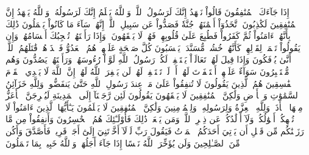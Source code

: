 إِذَا جَآءَكَ ٱلۡمُنَٰفِقُونَ قَالُواْ نَشۡهَدُ إِنَّكَ لَرَسُولُ ٱللَّهِۗ وَٱللَّهُ يَعۡلَمُ إِنَّكَ لَرَسُولُهُۥ وَٱللَّهُ يَشۡهَدُ إِنَّ ٱلۡمُنَٰفِقِينَ لَكَٰذِبُونَ
ٱتَّخَذُوٓاْ أَيۡمَٰنَهُمۡ جُنَّةٗ فَصَدُّواْ عَن سَبِيلِ ٱللَّهِۚ إِنَّهُمۡ سَآءَ مَا كَانُواْ يَعۡمَلُونَ
ذَٰلِكَ بِأَنَّهُمۡ ءَامَنُواْ ثُمَّ كَفَرُواْ فَطُبِعَ عَلَىٰ قُلُوبِهِمۡ فَهُمۡ لَا يَفۡقَهُونَ
۞وَإِذَا رَأَيۡتَهُمۡ تُعۡجِبُكَ أَجۡسَامُهُمۡۖ وَإِن يَقُولُواْ تَسۡمَعۡ لِقَوۡلِهِمۡۖ كَأَنَّهُمۡ خُشُبٞ مُّسَنَّدَةٞۖ يَحۡسَبُونَ كُلَّ صَيۡحَةٍ عَلَيۡهِمۡۚ هُمُ ٱلۡعَدُوُّ فَٱحۡذَرۡهُمۡۚ قَٰتَلَهُمُ ٱللَّهُۖ أَنَّىٰ يُؤۡفَكُونَ
وَإِذَا قِيلَ لَهُمۡ تَعَالَوۡاْ يَسۡتَغۡفِرۡ لَكُمۡ رَسُولُ ٱللَّهِ لَوَّوۡاْ رُءُوسَهُمۡ وَرَأَيۡتَهُمۡ يَصُدُّونَ وَهُم مُّسۡتَكۡبِرُونَ
سَوَآءٌ عَلَيۡهِمۡ أَسۡتَغۡفَرۡتَ لَهُمۡ أَمۡ لَمۡ تَسۡتَغۡفِرۡ لَهُمۡ لَن يَغۡفِرَ ٱللَّهُ لَهُمۡۚ إِنَّ ٱللَّهَ لَا يَهۡدِي ٱلۡقَوۡمَ ٱلۡفَٰسِقِينَ
هُمُ ٱلَّذِينَ يَقُولُونَ لَا تُنفِقُواْ عَلَىٰ مَنۡ عِندَ رَسُولِ ٱللَّهِ حَتَّىٰ يَنفَضُّواْۗ وَلِلَّهِ خَزَآئِنُ ٱلسَّمَٰوَٰتِ وَٱلۡأَرۡضِ وَلَٰكِنَّ ٱلۡمُنَٰفِقِينَ لَا يَفۡقَهُونَ
يَقُولُونَ لَئِن رَّجَعۡنَآ إِلَى ٱلۡمَدِينَةِ لَيُخۡرِجَنَّ ٱلۡأَعَزُّ مِنۡهَا ٱلۡأَذَلَّۚ وَلِلَّهِ ٱلۡعِزَّةُ وَلِرَسُولِهِۦ وَلِلۡمُؤۡمِنِينَ وَلَٰكِنَّ ٱلۡمُنَٰفِقِينَ لَا يَعۡلَمُونَ
يَـٰٓأَيُّهَا ٱلَّذِينَ ءَامَنُواْ لَا تُلۡهِكُمۡ أَمۡوَٰلُكُمۡ وَلَآ أَوۡلَٰدُكُمۡ عَن ذِكۡرِ ٱللَّهِۚ وَمَن يَفۡعَلۡ ذَٰلِكَ فَأُوْلَـٰٓئِكَ هُمُ ٱلۡخَٰسِرُونَ
وَأَنفِقُواْ مِن مَّا رَزَقۡنَٰكُم مِّن قَبۡلِ أَن يَأۡتِيَ أَحَدَكُمُ ٱلۡمَوۡتُ فَيَقُولَ رَبِّ لَوۡلَآ أَخَّرۡتَنِيٓ إِلَىٰٓ أَجَلٖ قَرِيبٖ فَأَصَّدَّقَ وَأَكُن مِّنَ ٱلصَّـٰلِحِينَ
وَلَن يُؤَخِّرَ ٱللَّهُ نَفۡسًا إِذَا جَآءَ أَجَلُهَاۚ وَٱللَّهُ خَبِيرُۢ بِمَا تَعۡمَلُونَ